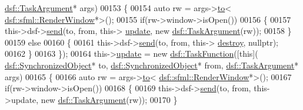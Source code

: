 \begin{DoxyCode}
      \hyperlink{classyc_1_1_any}{dsf::TaskArgument}* args)
00153                                          \{
00154                                              \textcolor{keyword}{auto} rw = args->\hyperlink{classyc_1_1_any_a3db663604505ef8d7e84dd41d5bfcc75}{to}<
      \hyperlink{classdsf_1_1sfml_1_1_render_window}{dsf::sfml::RenderWindow}*>();
00155                                              \textcolor{keywordflow}{if}(rw->window->isOpen())
00156                                              \{
00157                                                  this->dsf->\hyperlink{classdsf_1_1_dual_state_framework_a3063d7f0ce537eb44dc2bdcec816a36b}{send}(to, from, this->
      \hyperlink{class_my_d_s_f_1_1_sender_a15eb7f6b4e8124216e7fd29369543095}{update}, \textcolor{keyword}{new} \hyperlink{classyc_1_1_any}{dsf::TaskArgument}(rw));
00158                                              \}
00159                                              \textcolor{keywordflow}{else}
00160                                              \{
00161                                                  this->dsf->\hyperlink{classdsf_1_1_dual_state_framework_a3063d7f0ce537eb44dc2bdcec816a36b}{send}(to, from, this->
      \hyperlink{class_my_d_s_f_1_1_sender_a15d42b9428ac6e290d84937824058bc2}{destroy}, \textcolor{keyword}{nullptr});
00162                                              \}
00163                                          \});
00164     this->\hyperlink{class_my_d_s_f_1_1_sender_a15eb7f6b4e8124216e7fd29369543095}{update} = \textcolor{keyword}{new} \hyperlink{namespacedsf_aa16e735f29587f4485b56fc46746f7a9}{dsf::TaskFunction}([\textcolor{keyword}{this}](
      \hyperlink{classdsf_1_1_synchronized_object}{dsf::SynchronizedObject}* to, \hyperlink{classdsf_1_1_synchronized_object}{dsf::SynchronizedObject}* from, 
      \hyperlink{classyc_1_1_any}{dsf::TaskArgument}* args)
00165                                          \{
00166                                              \textcolor{keyword}{auto} rw = args->\hyperlink{classyc_1_1_any_a3db663604505ef8d7e84dd41d5bfcc75}{to}<
      \hyperlink{classdsf_1_1sfml_1_1_render_window}{dsf::sfml::RenderWindow}*>();
00167                                              \textcolor{keywordflow}{if}(rw->window->isOpen())
00168                                              \{
00169                                                  this->dsf->\hyperlink{classdsf_1_1_dual_state_framework_a3063d7f0ce537eb44dc2bdcec816a36b}{send}(to, from, this->update, \textcolor{keyword}{new} 
      \hyperlink{classyc_1_1_any}{dsf::TaskArgument}(rw));
00170                                              \}

\end{DoxyCode}
